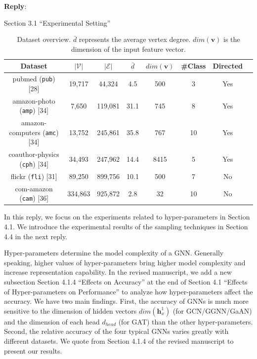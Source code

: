 \documentclass[12pt]{article}
\newcommand{\MyVec}[1]{\boldsymbol{#1}}
\newenvironment{myquote}[1]%
{\vspace{0.5em}\begin{zitat}{#1}}
{\end{zitat}\vspace{0.5em}}
\newenvironment{reply}
   {\medskip \noindent \textbf{Reply}:\  }
   {\medskip}
\begin{document}
\begin{reply}
\begin{myquote}{Section 3.1 ``Experimental Setting''}
    \begin{table}[H]
        \centering
        \begin{tabular}{cccccccc}
            \toprule
            Dataset                                                 & $|\mathcal{V}|$ & $|\mathcal{E}|$ & $\bar{d}$ & $dim(\boldsymbol{v})$ & \#Class & Directed \\
            \midrule
            pubmed (\texttt{pub}) [28]  & 19,717          & 44,324          & 4.5       & 500                   & 3       & Yes      \\
            amazon-photo (\texttt{amp}) [34]     & 7,650           & 119,081         & 31.1      & 745                   & 8       & Yes      \\
            amazon-computers (\texttt{amc}) [34] & 13,752          & 245,861         & 35.8      & 767                   & 10      & Yes      \\
            coauthor-physics (\texttt{cph}) [34] & 34,493          & 247,962         & 14.4      & 8415                  & 5       & Yes      \\
            flickr (\texttt{fli}) [31]                 & 89,250          & 899,756         & 10.1      & 500                   & 7       & No       \\
            com-amazon (\texttt{cam}) [36]               & 334,863         & 925,872         & 2.8       & 32                    & 10      & No       \\
            \bottomrule
        \end{tabular}
        \caption{Dataset overview. $\bar{d}$ represents the average vertex degree. $dim(\boldsymbol{v})$ is the dimension of the input feature vector.}
        \label{tab:dataset_overview}
    \end{table}

    \end{myquote}

    In this reply, we focus on the experiments related to hyper-parameters in Section 4.1.
    We introduce the experimental results of the sampling techniques in Section 4.4 in the next reply.

    Hyper-parameters determine the model complexity of a GNN.
    Generally speaking, higher values of hyper-parameters bring higher model complexity and increase representation capability.
    In the revised manuscript, we add a new subsection Section 4.1.4 ``Effects on Accuracy'' at the end of Section 4.1 ``Effects of Hyper-parameters on Performance'' to analyze how hyper-parameters affect the accuracy.
    We have two main findings.
    First, the accuracy of GNNs is much more sensitive to the dimension of hidden vectors $dim(\MyVec{h}^1_x)$ (for GCN/GGNN/GaAN) and the dimension of each head $d_{head}$ (for GAT) than the other hyper-parameters.
    Second, the relative accuracy of the four typical GNNs varies greatly with different datasets.
    We quote from Section 4.1.4 of the revised manuscript to present our results.


\end{reply}
\end{document}
